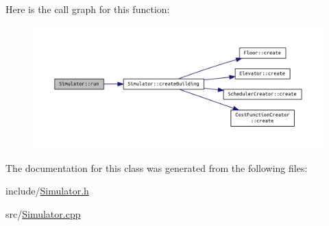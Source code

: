 Here is the call graph for this function\+:
\nopagebreak
\begin{figure}[H]
\begin{center}
\leavevmode
\includegraphics[width=350pt]{class_simulator_aa2de7e32b04cc3e8fc60aec23997621b_cgraph}
\end{center}
\end{figure}




The documentation for this class was generated from the following files\+:\begin{DoxyCompactItemize}
\item 
include/\hyperlink{_simulator_8h}{Simulator.\+h}\item 
src/\hyperlink{_simulator_8cpp}{Simulator.\+cpp}\end{DoxyCompactItemize}

